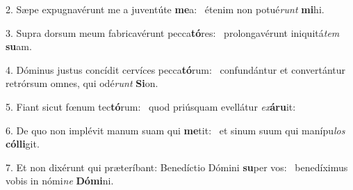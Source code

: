 2. Sæpe expugnavérunt me a juventúte \textbf{me}a: \ast\  étenim non potué\textit{runt} \textbf{mi}hi.\

3. Supra dorsum meum fabricavérunt pecca\textbf{tó}res: \ast\  prolongavérunt iniquitá\textit{tem} \textbf{su}am.\

4. Dóminus justus concídit cervíces pecca\textbf{tó}rum: \ast\  confundántur et convertántur retrórsum omnes, qui odé\textit{runt} \textbf{Si}on.\

5. Fiant sicut fœnum tec\textbf{tó}rum: \ast\  quod priúsquam evellátur \textit{ex}\textbf{á}\textbf{ru}it:\

6. De quo non implévit manum suam qui \textbf{me}tit: \ast\  et sinum suum qui manípu\textit{los} \textbf{cól}\textbf{li}git.\

7. Et non dixérunt qui præteríbant: Benedíctio Dómini \textbf{su}per vos: \ast\  benedíximus vobis in nómi\textit{ne} \textbf{Dó}\textbf{mi}ni.\

